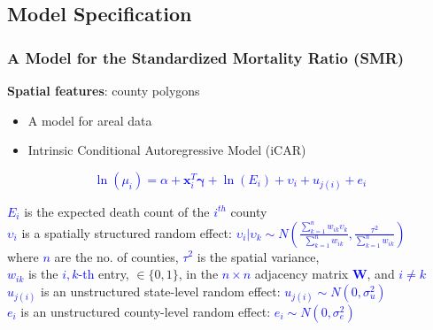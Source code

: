 \documentclass[aspectratio=169]{beamer}
\begin{document}
\subsection{Model Specification}
    \begin{frame}
	\frametitle{A Model for the Standardized Mortality Ratio (SMR)}
	
	\textbf{Spatial features}: county polygons
	\begin{itemize}
		\item A model for areal data
		\item Intrinsic Conditional Autoregressive Model (iCAR) 
	
	\end{itemize}
	\centering
	\begin{tcolorbox}[width = 7.2cm, colframe = red!75!black, title = \scriptsize{Model Specified}, height = 1.5cm, valign=center, halign=center, halign title = center]
		\textcolor{blue}{$$\ln(\mu_{i})=\alpha+\mathbf{x}_{i}^T\boldsymbol{\gamma}+\ln(E_{i})+\upsilon_{i}+u_{j(i)}+e_{i}$$}
	\end{tcolorbox}
	
	\scriptsize{ \textcolor{blue}{$E_i$} is the expected death count of the  \textcolor{blue}{$i^{th}$} county}\\
	   \scriptsize{  \textcolor{blue}{$\upsilon_{i}$} is a spatially structured random effect:  \textcolor{blue}{$\upsilon_{i}|\upsilon_{k}\sim N(\frac{\sum_{k=1}^{n}{w_{ik}\upsilon_k}}{\sum_{k=1}^{n}{w_{ik}}}, \frac{\tau^2}{\sum_{k=1}^{n}{w_{ik}}})$}} \\
	       \tiny{where  \textcolor{blue}{$n$} are the no. of counties,  \textcolor{blue}{$\tau^2$} is the spatial variance,\\ \textcolor{blue}{$w_{ik}$} is the \textcolor{blue}{$i,k$-th} entry, $\in \{0,1\}$, in the \textcolor{blue}{$n \times n$} adjacency matrix \textcolor{blue}{$\mathbf{W}$}, and  \textcolor{blue}{$i\neq k$}}\\
	       
	                    \scriptsize{  \textcolor{blue}{$u_{j(i)}$} is an unstructured state-level random effect:  \textcolor{blue}{$u_{j(i)} \sim N(0,\sigma^2_u)$}}\\
	       \vspace{0.2cm}
	       \scriptsize{  \textcolor{blue}{$e_{i}$} is an unstructured county-level random effect:  \textcolor{blue}{$e_{i} \sim N(0,\sigma^2_e)$}}

	\end{frame}
	
\end{document}
